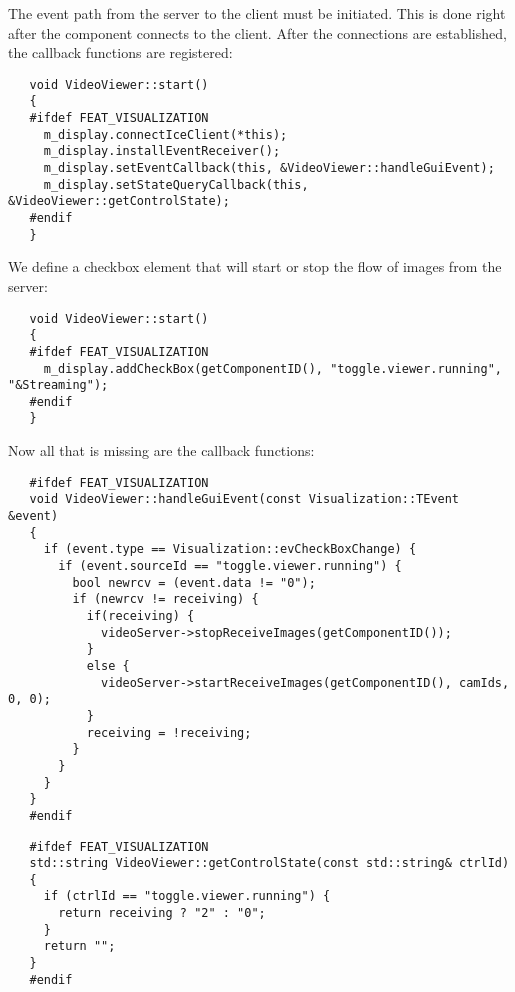 The event path from the server to the client must be initiated. This is done right
after the component connects to the client. After the connections are established,
the callback functions are registered:

\begin{verbatim}
   void VideoViewer::start()
   {
   #ifdef FEAT_VISUALIZATION
     m_display.connectIceClient(*this);
     m_display.installEventReceiver();
     m_display.setEventCallback(this, &VideoViewer::handleGuiEvent);
     m_display.setStateQueryCallback(this, &VideoViewer::getControlState);
   #endif
   }
\end{verbatim}

We define a checkbox element that will start or stop the flow of images
from the server:

\begin{verbatim}
   void VideoViewer::start()
   {
   #ifdef FEAT_VISUALIZATION
     m_display.addCheckBox(getComponentID(), "toggle.viewer.running", "&Streaming");
   #endif
   }
\end{verbatim}

Now all that is missing are the callback functions:

\begin{verbatim}
   #ifdef FEAT_VISUALIZATION
   void VideoViewer::handleGuiEvent(const Visualization::TEvent &event)
   {
     if (event.type == Visualization::evCheckBoxChange) {
       if (event.sourceId == "toggle.viewer.running") {
         bool newrcv = (event.data != "0");
         if (newrcv != receiving) {
           if(receiving) {
             videoServer->stopReceiveImages(getComponentID());
           }
           else {
             videoServer->startReceiveImages(getComponentID(), camIds, 0, 0);
           }
           receiving = !receiving;
         }
       }
     }
   }
   #endif
\end{verbatim}

\begin{verbatim}
   #ifdef FEAT_VISUALIZATION
   std::string VideoViewer::getControlState(const std::string& ctrlId)
   {
     if (ctrlId == "toggle.viewer.running") {
       return receiving ? "2" : "0";
     }
     return "";
   }
   #endif
\end{verbatim}

